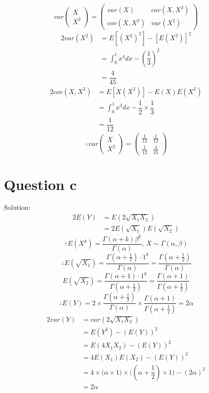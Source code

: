 \documentclass[a4papers]{ctexart}
\begin{document}
\[ var\begin{pmatrix}X \\ X^2 \end{pmatrix} 
    =\begin{pmatrix} var(X) & cov(X,X^2) \\ cov(X,X^2) & var(X^2) \end{pmatrix}\]        
\begin{alignat*}{2}
    var(X^2) &= E[(X^2)^2]-[E(X^2)]^2 \\
    &= \int_0^1 x^4 dx -\left( \dfrac{1}{3} \right)^2\\
    &= \dfrac{4}{45}
\end{alignat*}
\begin{alignat*}{2}
    cov(X,X^2) &= E[X(X^2)]-E(X)E(X^2)\\
    &=\int_0^1 x^3 dx -\dfrac{1}{2}\times\dfrac{1}{3}\\
    &=\dfrac{1}{12}
\end{alignat*}
\[
    \therefore   var\begin{pmatrix}X \\ X^2 \end{pmatrix} = \begin{pmatrix}\frac{1}{12} & \frac{1}{12} \\ \frac{1}{12} & \frac{4}{45}  \end{pmatrix}
\]

\section*{Question c}
\noindent Solution:
\begin{alignat*}{2}
   E(Y) &= E(2\sqrt{X_1 X_2})\\
        &= 2E(\sqrt{X_1})E(\sqrt{X_2})
\end{alignat*}
\[\because E\left( X^{k}\right) =\dfrac {\Gamma \left( \alpha +k\right) \beta ^{k}}{\Gamma \left( \alpha \right) },\, X\sim \Gamma(\alpha,\beta)\]
\[\therefore E\left(\sqrt{{X_1}}\right) =\dfrac {\Gamma \left( \alpha +\frac{1}{2}\right)\cdot 1 ^{k}}{\Gamma \left( \alpha \right) } = \dfrac {\Gamma \left( \alpha +\frac{1}{2}\right)}{\Gamma \left( \alpha \right) }\]
\[ E\left(\sqrt{{X_2}}\right) =\dfrac {\Gamma \left( \alpha + 1 \right) \cdot 1 ^{k}}{\Gamma \left( \alpha + \frac{1}{2}\right) } 
= \dfrac {\Gamma \left( \alpha + 1\right)}{\Gamma \left( \alpha +\frac{1}{2}\right) } \]
\[\therefore E(Y) 
  = 2\times\dfrac {\Gamma \left( \alpha + \frac{1}{2}\right)}{\Gamma \left( \alpha \right)}\times\dfrac {\Gamma \left( \alpha + 1\right)}{\Gamma \left( \alpha +\frac{1}{2}\right) }
  = 2\alpha\]
\begin{alignat*}{2}
    var(Y)&=var(2\sqrt{X_1 X_2})\\
          &=E(Y^2)-\left(E(Y)\right)^2\\
          &=E(4X_1 X_2)-\left(E(Y)\right)^2\\
          &=4E(X_1)E(X_2)-\left(E(Y)\right)^2\\
          &=4\times\Big(\alpha\times 1\Big)\times\Big((\alpha+\dfrac{1}{2})\times 1\Big)-(2\alpha)^2\\
          &=2\alpha
\end{alignat*}
\end{document}
